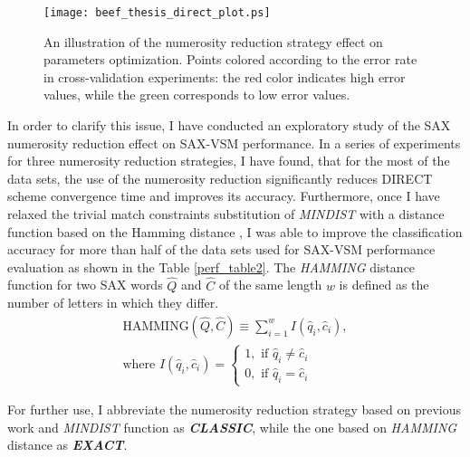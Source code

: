 \begin{figure}[ht]
   \centering
   \texttt{[image: beef\_thesis\_direct\_plot.ps]}
   \caption{
   An illustration of the numerosity reduction strategy effect on parameters optimization. 
   Points colored according to the error rate in cross-validation experiments: the red color indicates high error values, while 
   the green corresponds to low error values. 
   }
   \label{fig:sax_nr}
\end{figure}

In order to clarify this issue, I have conducted an exploratory study of the SAX numerosity reduction 
effect on SAX-VSM performance. In a series of experiments for three numerosity reduction strategies, I have found, 
that for the most of the data sets, the use of the numerosity reduction significantly reduces DIRECT scheme convergence 
time and improves its accuracy. 
Furthermore, once I have relaxed the trivial match constraints substitution of \textit{MINDIST} 
with a distance function based on the Hamming distance \cite{hamming}, 
I was able to improve the classification accuracy for more than half of the data sets used for \mbox{SAX-VSM}
performance evaluation as shown in the Table \ref{perf_table2}. 
The \textit{HAMMING} distance function for two SAX words $\hat{Q}$ and $\hat{C}$ of the same length $w$ 
is defined as the number of letters in which they differ.
\begin{equation}
\label{eq:hamming}
\begin{split}
\text{HAMMING}(\widehat{Q},\widehat{C}) \equiv \sum_{i=1}^{w} I( \widehat{q}_{i}, \widehat{c}_{i} ), \\
\text{where } I( \widehat{q}_{i}, \widehat{c}_{i} ) = 
\begin{cases}
 1,\text{ if } \widehat{q}_{i} \neq \widehat{c}_{i} \\
 0,\text{ if } \widehat{q}_{i} = \widehat{c}_{i}
\end{cases}
\end{split}                                                      
\end{equation}

For further use, I abbreviate the numerosity reduction strategy based on previous work and \textit{MINDIST} 
function as \textit{\textbf{CLASSIC}}, while the one based on \textit{HAMMING} distance as \textit{\textbf{EXACT}}.

